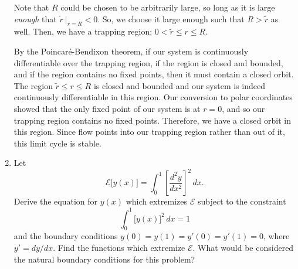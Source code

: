 \documentclass[10pt,letterpaper]{report}
\begin{document}
\begin{enumerate}
Note that $R$ could be chosen to be arbitrarily large, so long as it is large \textit{enough} that $\dot r\ \big \vert_{r = R} < 0$. So, we choose it large enough such that $R > \widetilde{r}$ as well. Then, we have a trapping region: $0 < \widetilde{r} \leq r \leq R$. 

By the Poincar\'e-Bendixon theorem, if our system is continuously differentiable over the trapping region, if the region is closed and bounded, and if the region contains no fixed points, then it must contain a closed orbit. The region $\widetilde{r} \leq r \leq R$ is closed and bounded and our system is indeed continuously differentiable in this region. Our conversion to polar coordinates showed that the only fixed point of our system is at $r = 0$, and so our trapping region contains no fixed points. Therefore, we have a closed orbit in this region. Since flow points into our trapping region rather than out of it, this limit cycle is stable.




\item \begin{qbox}
Let
\[
\mathcal{E}\big[y(x)\big] = \int_0^1 \left[\frac{d^2y}{dx^2}\right]^2\,dx.
\]
Derive the equation for $y(x)$ which extremizes $\mathcal{E}$ subject to the constraint
\[
\int_0^1 \big[y(x)\big]^2\,dx = 1
\]
and the boundary conditions $y(0) = y(1) = y'(0) = y'(1) = 0$, where $y' = dy/dx$. Find the functions which extremize $\mathcal E$. What would be considered the natural boundary conditions for this problem?
\end{qbox}


\end{enumerate}
\end{document}
